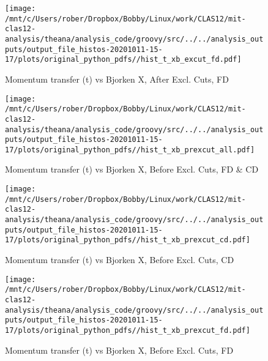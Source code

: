 \documentclass{article}
\begin{document}
\begin{landscape}
    \begin{figure}[h]
        \centering

        \texttt{[image: /mnt/c/Users/rober/Dropbox/Bobby/Linux/work/CLAS12/mit-clas12-analysis/theana/analysis\_code/groovy/src/../../analysis\_outputs/output\_file\_histos-20201011-15-17/plots/original\_python\_pdfs//hist\_t\_xb\_excut\_fd.pdf]}
        \captionsetup{textformat=empty,labelformat=blank}
        \caption{Momentum transfer (t) vs Bjorken X, After Excl. Cuts, FD}
    \end{figure}
    \clearpage
    
    \begin{figure}[h]
        \centering

        \texttt{[image: /mnt/c/Users/rober/Dropbox/Bobby/Linux/work/CLAS12/mit-clas12-analysis/theana/analysis\_code/groovy/src/../../analysis\_outputs/output\_file\_histos-20201011-15-17/plots/original\_python\_pdfs//hist\_t\_xb\_prexcut\_all.pdf]}
        \captionsetup{textformat=empty,labelformat=blank}
        \caption{Momentum transfer (t) vs Bjorken X, Before Excl. Cuts, FD \& CD}
    \end{figure}
    \clearpage
    
    \begin{figure}[h]
        \centering

        \texttt{[image: /mnt/c/Users/rober/Dropbox/Bobby/Linux/work/CLAS12/mit-clas12-analysis/theana/analysis\_code/groovy/src/../../analysis\_outputs/output\_file\_histos-20201011-15-17/plots/original\_python\_pdfs//hist\_t\_xb\_prexcut\_cd.pdf]}
        \captionsetup{textformat=empty,labelformat=blank}
        \caption{Momentum transfer (t) vs Bjorken X, Before Excl. Cuts, CD}
    \end{figure}
    \clearpage
    
    \begin{figure}[h]
        \centering

        \texttt{[image: /mnt/c/Users/rober/Dropbox/Bobby/Linux/work/CLAS12/mit-clas12-analysis/theana/analysis\_code/groovy/src/../../analysis\_outputs/output\_file\_histos-20201011-15-17/plots/original\_python\_pdfs//hist\_t\_xb\_prexcut\_fd.pdf]}
        \captionsetup{textformat=empty,labelformat=blank}
        \caption{Momentum transfer (t) vs Bjorken X, Before Excl. Cuts, FD}
    \end{figure}
    \clearpage
    
    \begin{figure}[h]
        \centering


\end{figure}
\end{landscape}
\end{document}
